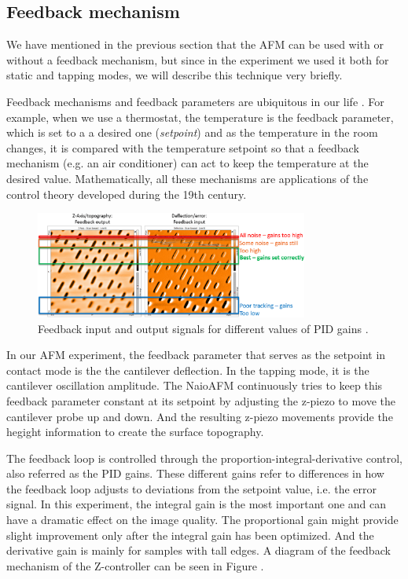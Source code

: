\documentclass[11pt,a4paper]{article}
\begin{document}
\subsection{Feedback mechanism}
We have mentioned in the previous section that the AFM can be used with or without a feedback mechanism, but since in the experiment we used it both for static and tapping modes, we will describe this technique very briefly.

Feedback mechanisms and feedback parameters are ubiquitous in our life \cite{nanosurf}. For example, when we use a thermostat, the temperature is the feedback parameter, which is set to a a desired one (\emph{setpoint}) and as the temperature in the room changes, it is compared with the temperature setpoint so that a feedback mechanism (e.g. an air conditioner) can act to keep the temperature at the desired value. Mathematically, all these mechanisms are applications of the control theory developed during the 19th century.

\begin{figure}[hbt]
\centering
\includegraphics[width=0.8\textwidth]{afm-modes-feedback}
\caption{Feedback input and output signals for different values of PID gains \cite{nanosurf}.}
\label{fig:feedback}
\end{figure}

In our AFM experiment, the feedback parameter that serves as the setpoint in contact mode is the the cantilever deflection. In the tapping mode, it is the cantilever oscillation amplitude. The NaioAFM continuously tries to keep this feedback parameter constant at its setpoint by adjusting the z-piezo to move the cantilever probe up and down. And the resulting z-piezo movements provide the hegight information to create the surface topography.

The feedback loop is controlled through the proportion-integral-derivative control, also referred as the PID gains. These different gains refer to differences in how the feedback loop adjusts to deviations from the setpoint value, i.e. the error signal. In this experiment, the integral gain is the most important one and can have a dramatic effect on the image quality. The proportional gain might provide slight improvement only after the integral gain has been optimized. And the derivative gain is mainly for samples with tall edges. A diagram of the feedback mechanism of the Z-controller can be seen in Figure .
\end{document}
